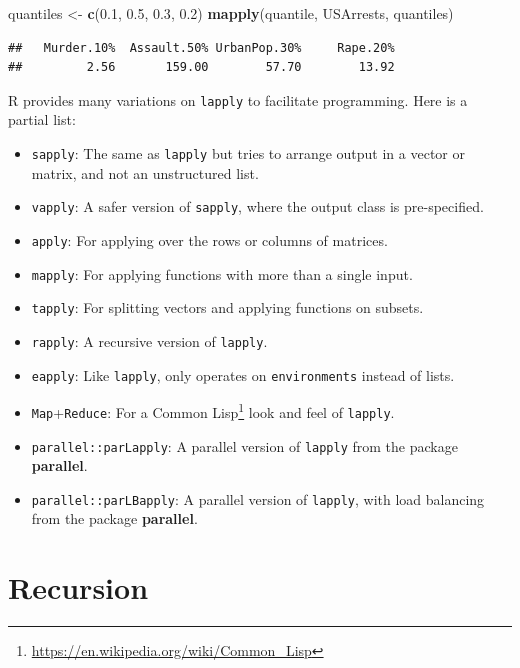 \documentclass[]{book}
\newenvironment{Shaded}{\begin{snugshade}}{\end{snugshade}}
\newcommand{\FloatTok}[1]{\textcolor[rgb]{0.00,0.00,0.81}{#1}}
\newcommand{\KeywordTok}[1]{\textcolor[rgb]{0.13,0.29,0.53}{\textbf{#1}}}
\newcommand{\NormalTok}[1]{#1}
\newcommand{\StringTok}[1]{\textcolor[rgb]{0.31,0.60,0.02}{#1}}
\providecommand{\tightlist}{%
  \setlength{\itemsep}{0pt}\setlength{\parskip}{0pt}}
\renewcommand{\href}[2]{#2\footnote{\url{#1}}}
\theoremstyle{definition}
\theoremstyle{definition}
\theoremstyle{definition}
\theoremstyle{remark}
\begin{document}
\begin{Shaded}
\begin{Highlighting}[]
\NormalTok{quantiles <-}\StringTok{ }\KeywordTok{c}\NormalTok{(}\FloatTok{0.1}\NormalTok{, }\FloatTok{0.5}\NormalTok{, }\FloatTok{0.3}\NormalTok{, }\FloatTok{0.2}\NormalTok{)}
\KeywordTok{mapply}\NormalTok{(quantile, USArrests, quantiles)}
\end{Highlighting}
\end{Shaded}

\begin{verbatim}
##   Murder.10%  Assault.50% UrbanPop.30%     Rape.20% 
##         2.56       159.00        57.70        13.92
\end{verbatim}

R provides many variations on \texttt{lapply} to facilitate programming.
Here is a partial list:

\begin{itemize}
\tightlist
\item
  \texttt{sapply}: The same as \texttt{lapply} but tries to arrange output in a vector or matrix, and not an unstructured list.
\item
  \texttt{vapply}: A safer version of \texttt{sapply}, where the output class is pre-specified.
\item
  \texttt{apply}: For applying over the rows or columns of matrices.
\item
  \texttt{mapply}: For applying functions with more than a single input.
\item
  \texttt{tapply}: For splitting vectors and applying functions on subsets.
\item
  \texttt{rapply}: A recursive version of \texttt{lapply}.
\item
  \texttt{eapply}: Like \texttt{lapply}, only operates on \texttt{environments} instead of lists.
\item
  \texttt{Map}+\texttt{Reduce}: For a \href{https://en.wikipedia.org/wiki/Common_Lisp}{Common Lisp} look and feel of \texttt{lapply}.
\item
  \texttt{parallel::parLapply}: A parallel version of \texttt{lapply} from the package \textbf{parallel}.
\item
  \texttt{parallel::parLBapply}: A parallel version of \texttt{lapply}, with load balancing from the package \textbf{parallel}.
\end{itemize}

\hypertarget{recursion}{%
\section{Recursion}\label{recursion}}
\end{document}
